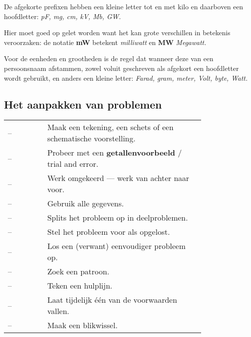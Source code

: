 \documentclass[a5paper]{article}
\begin{document}
\medskip
\noindent
De afgekorte prefixen hebben een kleine letter tot en met kilo en daarboven een hoofdletter:
\emph{pF, mg, cm, kV, Mb, GW.}

\medskip
\noindent
Hier moet goed op gelet worden want het kan grote verschillen in betekenis veroorzaken:
de notatie \textbf{mW} betekent \emph{milliwatt} en \textbf{MW} \emph{Megawatt.}

\medskip
\noindent
Voor de eenheden en grootheden is de regel dat wanneer deze van een persoonsnaam afstammen,
zowel voluit geschreven als afgekort een hoofdletter wordt gebruikt, en anders een kleine letter:
\emph{Farad, gram, meter, Volt, byte, Watt.}



\subsection{Het aanpakken van problemen}

\begin{center}
\renewcommand{\arraystretch}{1.1}
\begin{tabular}{@{}lp{0.8\linewidth}@{}}
-- & Maak een tekening, een schets of een schematische voorstelling. \\
-- & Probeer met een \textbf{getallenvoorbeeld} / trial and error. \\
-- & Werk omgekeerd — werk van achter naar voor. \\
-- & Gebruik alle gegevens. \\
-- & Splits het probleem op in deelproblemen. \\
-- & Stel het probleem voor als opgelost. \\
-- & Los een (verwant) eenvoudiger probleem op. \\
-- & Zoek een patroon. \\
-- & Teken een hulplijn. \\
-- & Laat tijdelijk één van de voorwaarden vallen. \\
-- & Maak een blikwissel. \\
\end{tabular}
\end{center}
\end{document}
